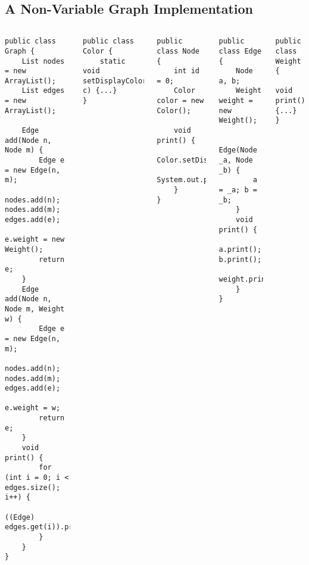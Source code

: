 \subsection{A Non-Variable Graph Implementation}
\begin{frame}[fragile]{\myframetitle}
	\begin{tiny}
		\begin{columns}
\begin{lstlisting}
public class Graph {
	List nodes = new ArrayList();
	List edges = new ArrayList();

	Edge add(Node n, Node m) {
		Edge e = new Edge(n, m);
		nodes.add(n); nodes.add(m); edges.add(e);
		e.weight = new Weight();
		return e;
	}
	Edge add(Node n, Node m, Weight w) {
		Edge e = new Edge(n, m);
		nodes.add(n); nodes.add(m); edges.add(e);
		e.weight = w;
		return e;
	}
	void print() {
		for (int i = 0; i < edges.size(); i++) {
			((Edge) edges.get(i)).print();
		}
	}
}
\end{lstlisting}
\begin{lstlisting}
public class Color {
	static void setDisplayColor(Color c) {...}
}
\end{lstlisting}	
\begin{lstlisting}
public class Node {
	int id = 0;
	Color color = new Color();

	void print() {
		Color.setDisplayColor(color);
		System.out.print(id);
	}
}
\end{lstlisting}
\begin{lstlisting}
public class Edge {
	Node a, b;
	Weight weight = new Weight();

	Edge(Node _a, Node _b) {
		a = _a; b = _b;
	}
	void print() {
		a.print(); b.print();
		weight.print();
	}
}
\end{lstlisting}
\begin{lstlisting}
public class Weight {
	void print() {...}
}
\end{lstlisting}
		\end{columns}
	\end{tiny}
\end{frame}


